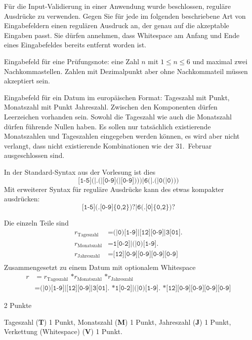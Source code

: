 Für die Input-Validierung in einer Anwendung wurde beschlossen, reguläre
Ausdrücke zu verwenden.
Gegen Sie für jede im folgenden beschriebene Art von Eingabefeldern einen
regulären Ausdruck an, der genau auf die akzeptable Eingaben passt.
Sie dürfen annehmen, dass Whitespace am Anfang und Ende eines Eingabefeldes
bereits entfernt worden ist.
\begin{teilaufgaben}
\item
Eingabefeld für eine Prüfungsnote: eine Zahl $n$ mit $1\le n\le 6$
und maximal zwei Nachkommastellen.
Zahlen mit Dezimalpunkt aber ohne Nachkommateil müssen akzeptiert sein.
\item
Eingabefeld für ein Datum im europäischen Format: Tageszahl mit Punkt,
Monatszahl mit Punkt Jahreszahl. Zwischen den Komponenten dürfen Leerzeichen
vorhanden sein.
Sowohl die Tageszahl wie auch die Monatszahl dürfen führende Nullen haben.
Es sollen nur tatsächlich existierende Monatszahlen
und Tageszahlen eingegeben werden können, es wird aber nicht verlangt,
dass nicht existierende Kombinationen wie der 31.~Februar ausgeschlossen
sind.
\end{teilaufgaben}

\begin{loesung}
\begin{teilaufgaben}
\item In der Standard-Syntax aus der Vorlesung ist dies
\[
\texttt{[1-5](|.(|[0-9](|[0-9])))|6(|.(|0(|0)))}
\]
Mit erweiterer Syntax für reguläre Ausdrücke kann des etwas kompakter
ausdrücken:
\[
\texttt{[1-5](.[0-9]\{0,2\})?|6(.[0]\{0,2\})?}
\]
\item Die einzeln Teile sind
\begin{align*}
r_{\text{Tageszahl}}
&=
\texttt{(|0)[1-9]|[12][0-9]|3[01].}
\\
r_{\text{Monatszahl}}
&=
\texttt{1[0-2]|(|0)[1-9].}
\\
r_{\text{Jahreszahl}}
&=
\texttt{[12][0-9][0-9][0-9][0-9]}
\\
\end{align*}
Zusammengesetzt zu einem Datum mit optionalem Whitespace
\begin{align*}
r
&=
r_{\text{Tageszahl}}
\texttt{ *}
r_{\text{Monatszahl}}
\texttt{ *}
r_{\text{Jahreszahl}}
\\
&=
\texttt{(|0)[1-9]|[12][0-9]|3[01].}
\texttt{ *}
\texttt{1[0-2]|(|0)[1-9].}
\texttt{ *}
\texttt{[12][0-9][0-9][0-9][0-9]}
\end{align*}
\end{teilaufgaben}
\end{loesung}

\begin{bewertung}
\begin{teilaufgaben}
\item 2 Punkte
\item Tageszahl ({\bf T}) 1 Punkt, Monatszahl ({\bf M}) 1 Punkt,
Jahreszahl ({\bf J}) 1 Punkt, Verkettung (Whitespace) ({\bf V}) 1 Punkt.
\end{teilaufgaben}
\end{bewertung}


